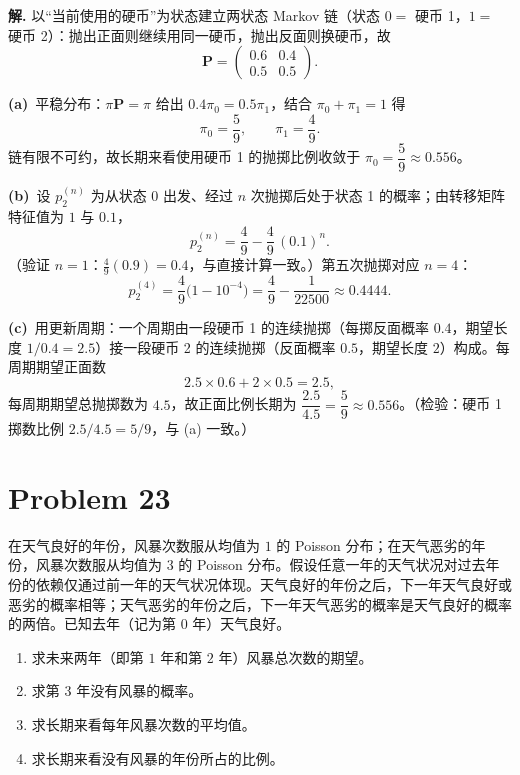 \documentclass[12pt,a4paper]{article}
\begin{document}
\begin{answerbox}
\textbf{解.}
以“当前使用的硬币”为状态建立两状态 Markov 链（状态 $0=$ 硬币 1，$1=$ 硬币 2）：抛出正面则继续用同一硬币，抛出反面则换硬币，故
\[
\mathbf{P}=\begin{pmatrix}0.6&0.4\\[2pt]0.5&0.5\end{pmatrix}.
\]

\textbf{(a)}\ 平稳分布：$\pi\mathbf{P}=\pi$ 给出 $0.4\pi_0=0.5\pi_1$，结合 $\pi_0+\pi_1=1$ 得
\[
\pi_0=\frac59,\qquad \pi_1=\frac49 .
\]
链有限不可约，故长期来看使用硬币 1 的抛掷比例收敛于 $\pi_0=\dfrac59\approx0.556$。

\textbf{(b)}\ 设 $p_2^{(n)}$ 为从状态 0 出发、经过 $n$ 次抛掷后处于状态 1 的概率；由转移矩阵特征值为 $1$ 与 $0.1$，
\[
p_2^{(n)}=\frac49-\frac49\,(0.1)^n .
\]
（验证 $n=1$：$\frac49(0.9)=0.4$，与直接计算一致。）第五次抛掷对应 $n=4$：
\[
p_2^{(4)}=\frac49\big(1-10^{-4}\big)=\frac49-\frac{1}{22500}\approx 0.4444 .
\]

\textbf{(c)}\ 用更新周期：一个周期由一段硬币 1 的连续抛掷（每掷反面概率 $0.4$，期望长度 $1/0.4=2.5$）接一段硬币 2 的连续抛掷（反面概率 $0.5$，期望长度 $2$）构成。每周期期望正面数
\[
2.5\times0.6+2\times0.5=2.5,
\]
每周期期望总抛掷数为 $4.5$，故正面比例长期为 $\dfrac{2.5}{4.5}=\dfrac59\approx0.556$。（检验：硬币 1 掷数比例 $2.5/4.5=5/9$，与 (a) 一致。）
\end{answerbox}

\section{Problem 23}

在天气良好的年份，风暴次数服从均值为 $1$ 的 Poisson 分布；在天气恶劣的年份，风暴次数服从均值为 $3$ 的 Poisson 分布。假设任意一年的天气状况对过去年份的依赖仅通过前一年的天气状况体现。天气良好的年份之后，下一年天气良好或恶劣的概率相等；天气恶劣的年份之后，下一年天气恶劣的概率是天气良好的概率的两倍。已知去年（记为第 $0$ 年）天气良好。
\begin{enumerate}[label=(\alph*),leftmargin=2em,itemsep=4pt]
\item 求未来两年（即第 $1$ 年和第 $2$ 年）风暴总次数的期望。
\item 求第 $3$ 年没有风暴的概率。
\item 求长期来看每年风暴次数的平均值。
\item 求长期来看没有风暴的年份所占的比例。
\end{enumerate}
\end{document}
